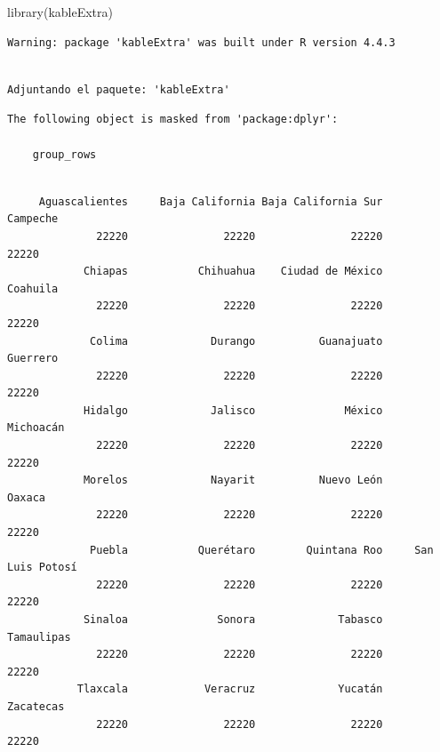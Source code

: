 \documentclass[
  letterpaper,
  DIV=11,
  numbers=noendperiod]{scrartcl}
\newenvironment{Shaded}{\begin{snugshade}}{\end{snugshade}}
\newcommand{\CommentTok}[1]{\textcolor[rgb]{0.37,0.37,0.37}{#1}}
\newcommand{\FunctionTok}[1]{\textcolor[rgb]{0.28,0.35,0.67}{#1}}
\newcommand{\NormalTok}[1]{\textcolor[rgb]{0.00,0.23,0.31}{#1}}
\newcommand{\OtherTok}[1]{\textcolor[rgb]{0.00,0.23,0.31}{#1}}
\newcommand{\SpecialCharTok}[1]{\textcolor[rgb]{0.37,0.37,0.37}{#1}}
\newcommand{\StringTok}[1]{\textcolor[rgb]{0.13,0.47,0.30}{#1}}
\begin{document}
\begin{Shaded}
\begin{Highlighting}[]
\FunctionTok{library}\NormalTok{(kableExtra)}
\end{Highlighting}
\end{Shaded}

\begin{verbatim}
Warning: package 'kableExtra' was built under R version 4.4.3
\end{verbatim}

\begin{verbatim}

Adjuntando el paquete: 'kableExtra'
\end{verbatim}

\begin{verbatim}
The following object is masked from 'package:dplyr':

    group_rows
\end{verbatim}

\begin{Shaded}
\end{Shaded}

\begin{verbatim}

     Aguascalientes     Baja California Baja California Sur            Campeche 
              22220               22220               22220               22220 
            Chiapas           Chihuahua    Ciudad de México            Coahuila 
              22220               22220               22220               22220 
             Colima             Durango          Guanajuato            Guerrero 
              22220               22220               22220               22220 
            Hidalgo             Jalisco              México           Michoacán 
              22220               22220               22220               22220 
            Morelos             Nayarit          Nuevo León              Oaxaca 
              22220               22220               22220               22220 
             Puebla           Querétaro        Quintana Roo     San Luis Potosí 
              22220               22220               22220               22220 
            Sinaloa              Sonora             Tabasco          Tamaulipas 
              22220               22220               22220               22220 
           Tlaxcala            Veracruz             Yucatán           Zacatecas 
              22220               22220               22220               22220 
\end{verbatim}
\end{document}
